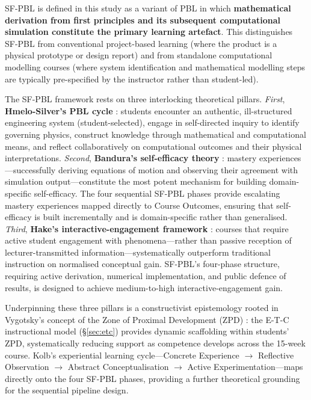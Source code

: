 \documentclass[utf8]{FrontiersinHarvard}
\begin{document}
SF-PBL is defined in this study as a variant of PBL in which
\textbf{mathematical derivation from first principles and its subsequent
computational simulation constitute the primary learning artefact}. This
distinguishes SF-PBL from conventional project-based learning (where the
product is a physical prototype or design report) and from standalone
computational modelling courses (where system identification and mathematical
modelling steps are typically pre-specified by the instructor rather than
student-led).

The SF-PBL framework rests on three interlocking theoretical pillars.
\textit{First}, \textbf{Hmelo-Silver's PBL cycle} \citeyearpar{hmelo2004problem}:
students encounter an authentic, ill-structured engineering system
(student-selected), engage in self-directed inquiry to identify governing
physics, construct knowledge through mathematical and computational means,
and reflect collaboratively on computational outcomes and their physical
interpretations. \textit{Second}, \textbf{Bandura's self-efficacy theory}
\citeyearpar{bandura1997self}: mastery experiences---successfully deriving
equations of motion and observing their agreement with simulation
output---constitute the most potent mechanism for building domain-specific
self-efficacy. The four sequential SF-PBL phases provide escalating mastery
experiences mapped directly to Course Outcomes, ensuring that self-efficacy
is built incrementally and is domain-specific rather than generalised.
\textit{Third}, \textbf{Hake's interactive-engagement framework}
\citeyearpar{hake1998interactive}: courses that require active student
engagement with phenomena---rather than passive reception of
lecturer-transmitted information---systematically outperform traditional
instruction on normalised conceptual gain. SF-PBL's four-phase structure,
requiring active derivation, numerical implementation, and public defence
of results, is designed to achieve medium-to-high interactive-engagement
gain.

Underpinning these three pillars is a constructivist epistemology rooted in
Vygotsky's concept of the Zone of Proximal Development (ZPD)
\citep{vygotsky1978mind}: the E-T-C instructional model (§\ref{sec:etc})
provides dynamic scaffolding within students' ZPD, systematically reducing
support as competence develops across the 15-week course. Kolb's
\citeyearpar{kolb1984experiential} experiential learning cycle---Concrete
Experience $\rightarrow$ Reflective Observation $\rightarrow$ Abstract
Conceptualisation $\rightarrow$ Active Experimentation---maps directly onto
the four SF-PBL phases, providing a further theoretical grounding for the
sequential pipeline design.
\end{document}
